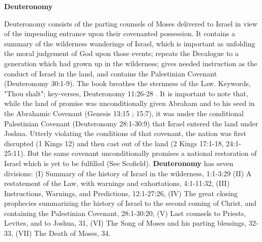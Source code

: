 \documentclass[11pt,landscape,twocolumn,letterpaper]{article}
\begin{document}

\begin{center}
\textbf{Deuteronomy}
\end{center}
Deuteronomy consists of the parting counsels of Moses delivered to Israel in view of the impending entrance upon their covenanted possession. It contains a summary of the wilderness wanderings of Israel, which is important as unfolding the moral judgement of God upon those events; repeats the Decalogue to a generation which had grown up in the wilderness; gives needed instruction as the conduct of Israel in the land, and contains the Palestinian Covenant (Deuteronomy 30:1-9). The book breathes the sternness of the Law. Keywords, "Thou shalt"; key-verses, Deuteronomy 11:26-28 . It is important to note that, while the land of promise was unconditionally given Abraham and to his seed in the Abrahamic Covenant (Genesis 13:15 ; 15:7), it was under the conditional Palestinian Covenant (Deuteronomy 28:1-30:9) that Israel entered the land under Joshua. Utterly violating the conditions of that covenant, the nation was first disrupted (1 Kings 12) and then cast out of the land (2 Kings 17:1-18, 24:1-25:11). But the same covenant unconditionally promises a national restoration of Israel which is yet to be fulfilled (See Scofield). \textbf{Deuteronomy} has seven divisions: (I) Summary of the history of Israel in the wilderness, 1:1-3:29 (II) A restatement of the Law, with warnings and exhortations, 4:1-11:32, (III) Instructions, Warnings, and Predictions, 12:1-27:26, (IV) The great closing prophecies summarizing the history of Israel to the second coming of Christ, and containing the Palestinian Covenant, 28:1-30:20, (V) Last counsels to Priests, Levites, and to Joshua, 31, (VI) The Song of Moses and his parting blessings, 32-33, (VII) The Death of Moses, 34. 
\end{document}
